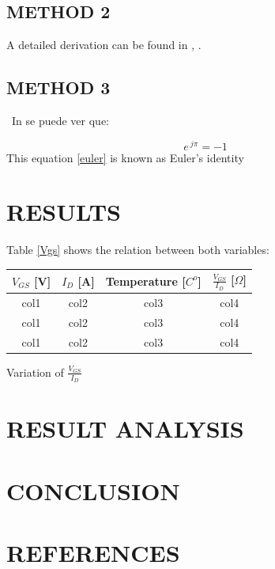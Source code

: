 \documentclass[]{article}
\makeatletter
\newenvironment{tablehere}		%
  {\def\@captype{table}}		%
  {}							%
\makeatother
\begin{document}
\begin{multicols}{2}
\subsection{METHOD 2} %
\lipsum[7]
A detailed derivation can be found in \cite{Sh:572} , \cite{Sh:575}.
\subsection{METHOD 3} %
\
\lipsum[8] 
In \cite{webster} se puede ver que:

\begin{equation}
 e^{ \ j  \pi} = -1
 \label{euler}
\end{equation}
This equation \ref{euler} is known as Euler's identity
\section{RESULTS}
Table \ref{Vgs} shows the relation between both variables:
\begin{tablehere}
\begin{center}
\begin{tabular}{|c|c|c|c|}
\hline
$V_{GS}$ [V] & $I_{D}$ [A] & Temperature [$C^{o}$] & $\frac{V_{GS}}{I_D}$ [$\Omega$] \\ 
\hline
col1 & col2 & col3 & col4 \\

col1 & col2 & col3 & col4 \\

col1 & col2 & col3 & col4 \\
\hline
\end{tabular}
\caption{Variation of $\frac{V_{GS}}{I_D}$}
\label{Vgs}
\end{center}
\end{tablehere}
\lipsum[1]


\section{RESULT ANALYSIS}
\lipsum[1]
\section{CONCLUSION}
\lipsum[1]
\section{REFERENCES}
\printbibliography 
\end{multicols}
 
\end{document}
